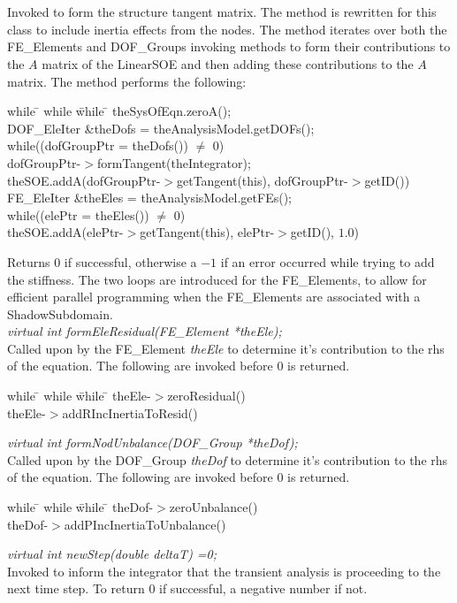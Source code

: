 \\
 \\
Invoked to form the structure tangent matrix. The method is rewritten
for this class to include inertia effects from the nodes. The method
iterates over both the FE\_Elements and DOF\_Groups invoking methods
to form their contributions to the $A$ matrix of the LinearSOE and
then adding these contributions to the $A$ matrix. The method performs
the following:
\begin{tabbing}
while \= \+ while \= while \= \kill
theSysOfEqn.zeroA();\\
DOF\_EleIter \&theDofs = theAnalysisModel.getDOFs();\\
while((dofGroupPtr = theDofs()) $\neq$ 0) \+ \\
dofGroupPtr-$>$formTangent(theIntegrator); \\
theSOE.addA(dofGroupPtr-$>$getTangent(this),
dofGroupPtr-$>$getID()) \- \\
FE\_EleIter \&theEles = theAnalysisModel.getFEs();\\
while((elePtr = theEles()) $\neq$ 0) \+ \\
theSOE.addA(elePtr-$>$getTangent(this),
elePtr-$>$getID(), $1.0$) \\
\end{tabbing}
\noindent Returns $0$ if successful, otherwise a $-1$ if an error occurred while
trying to add the stiffness. The two loops are introduced for the
FE\_Elements, to allow for efficient parallel programming when the
FE\_Elements are associated with a ShadowSubdomain.\\ 

{\em virtual int formEleResidual(FE\_Element *theEle);} \\
Called upon by the FE\_Element {\em theEle} to determine it's
contribution to the rhs of the equation. The following are invoked
before $0$ is returned.
\begin{tabbing}
while \= \+ while \= while \= \kill
theEle-$>$zeroResidual() \\
theEle-$>$addRIncInertiaToResid() \\
\end{tabbing}

{\em virtual int formNodUnbalance(DOF\_Group *theDof);} \\
Called upon by the DOF\_Group {\em theDof} to determine it's
contribution to the rhs of the equation. The following are invoked
before $0$ is returned.
\begin{tabbing}
while \= \+ while \= while \= \kill
theDof-$>$zeroUnbalance() \\
theDof-$>$addPIncInertiaToUnbalance() \\
\end{tabbing}

{\em virtual int newStep(double deltaT) =0;} \\
Invoked to inform the integrator that the transient analysis is
proceeding to the next time step. To return $0$ if successful, a
negative number if not.\\





